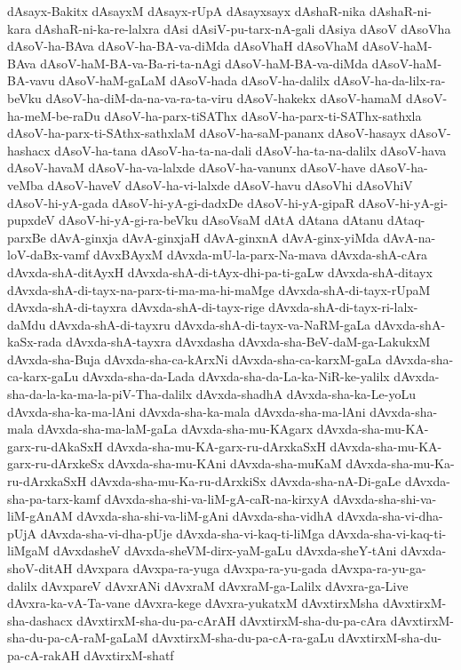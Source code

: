 {dAsayx-Bakitx
dAsayxM
dAsayx-rUpA
dAsayxsayx
dAshaR-nika
dAshaR-ni-kara
dAshaR-ni-ka-re-lalxra
dAsi
dAsiV-pu-tarx-nA-gali
dAsiya
dAsoV
dAsoVha
dAsoV-ha-BAva
dAsoV-ha-BA-va-diMda
dAsoVhaH
dAsoVhaM
dAsoV-haM-BAva
dAsoV-haM-BA-va-Ba-ri-ta-nAgi
dAsoV-haM-BA-va-diMda
dAsoV-haM-BA-vavu
dAsoV-haM-gaLaM
dAsoV-hada
dAsoV-ha-dalilx
dAsoV-ha-da-lilx-ra-beVku
dAsoV-ha-diM-da-na-va-ra-ta-viru
dAsoV-hakekx
dAsoV-hamaM
dAsoV-ha-meM-be-raDu
dAsoV-ha-parx-tiSAThx
dAsoV-ha-parx-ti-SAThx-sathxla
dAsoV-ha-parx-ti-SAthx-sathxlaM
dAsoV-ha-saM-pananx
dAsoV-hasayx
dAsoV-hashacx
dAsoV-ha-tana
dAsoV-ha-ta-na-dali
dAsoV-ha-ta-na-dalilx
dAsoV-hava
dAsoV-havaM
dAsoV-ha-va-lalxde
dAsoV-ha-vanunx
dAsoV-have
dAsoV-ha-veMba
dAsoV-haveV
dAsoV-ha-vi-lalxde
dAsoV-havu
dAsoVhi
dAsoVhiV
dAsoV-hi-yA-gada
dAsoV-hi-yA-gi-dadxDe
dAsoV-hi-yA-gipaR
dAsoV-hi-yA-gi-pupxdeV
dAsoV-hi-yA-gi-ra-beVku
dAsoVsaM
dAtA
dAtana
dAtanu
dAtaq-parxBe
dAvA-ginxja
dAvA-ginxjaH
dAvA-ginxnA
dAvA-ginx-yiMda
dAvA-na-loV-daBx-vamf
dAvxBAyxM
dAvxda-mU-la-parx-Na-mava
dAvxda-shA-cAra
dAvxda-shA-ditAyxH
dAvxda-shA-di-tAyx-dhi-pa-ti-gaLw
dAvxda-shA-ditayx
dAvxda-shA-di-tayx-na-parx-ti-ma-ma-hi-maMge
dAvxda-shA-di-tayx-rUpaM
dAvxda-shA-di-tayxra
dAvxda-shA-di-tayx-rige
dAvxda-shA-di-tayx-ri-lalx-daMdu
dAvxda-shA-di-tayxru
dAvxda-shA-di-tayx-va-NaRM-gaLa
dAvxda-shA-kaSx-rada
dAvxda-shA-tayxra
dAvxdasha
dAvxda-sha-BeV-daM-ga-LakukxM
dAvxda-sha-Buja
dAvxda-sha-ca-kArxNi
dAvxda-sha-ca-karxM-gaLa
dAvxda-sha-ca-karx-gaLu
dAvxda-sha-da-Lada
dAvxda-sha-da-La-ka-NiR-ke-yalilx
dAvxda-sha-da-la-ka-ma-la-piV-Tha-dalilx
dAvxda-shadhA
dAvxda-sha-ka-Le-yoLu
dAvxda-sha-ka-ma-lAni
dAvxda-sha-ka-mala
dAvxda-sha-ma-lAni
dAvxda-sha-mala
dAvxda-sha-ma-laM-gaLa
dAvxda-sha-mu-KAgarx
dAvxda-sha-mu-KA-garx-ru-dAkaSxH
dAvxda-sha-mu-KA-garx-ru-dArxkaSxH
dAvxda-sha-mu-KA-garx-ru-dArxkeSx
dAvxda-sha-mu-KAni
dAvxda-sha-muKaM
dAvxda-sha-mu-Ka-ru-dArxkaSxH
dAvxda-sha-mu-Ka-ru-dArxkiSx
dAvxda-sha-nA-Di-gaLe
dAvxda-sha-pa-tarx-kamf
dAvxda-sha-shi-va-liM-gA-caR-na-kirxyA
dAvxda-sha-shi-va-liM-gAnAM
dAvxda-sha-shi-va-liM-gAni
dAvxda-sha-vidhA
dAvxda-sha-vi-dha-pUjA
dAvxda-sha-vi-dha-pUje
dAvxda-sha-vi-kaq-ti-liMga
dAvxda-sha-vi-kaq-ti-liMgaM
dAvxdasheV
dAvxda-sheVM-dirx-yaM-gaLu
dAvxda-sheY-tAni
dAvxda-shoV-ditAH
dAvxpara
dAvxpa-ra-yuga
dAvxpa-ra-yu-gada
dAvxpa-ra-yu-ga-dalilx
dAvxpareV
dAvxrANi
dAvxraM
dAvxraM-ga-Lalilx
dAvxra-ga-Live
dAvxra-ka-vA-Ta-vane
dAvxra-kege
dAvxra-yukatxM
dAvxtirxMsha
dAvxtirxM-sha-dashacx
dAvxtirxM-sha-du-pa-cArAH
dAvxtirxM-sha-du-pa-cAra
dAvxtirxM-sha-du-pa-cA-raM-gaLaM
dAvxtirxM-sha-du-pa-cA-ra-gaLu
dAvxtirxM-sha-du-pa-cA-rakAH
dAvxtirxM-shatf
}
